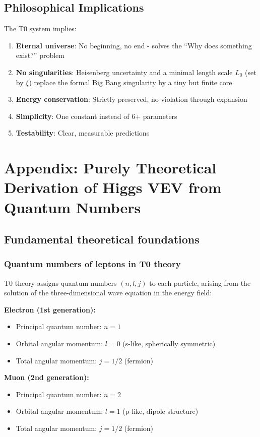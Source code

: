 \subsection{Philosophical Implications}
\label{subsec:philosophical_implications}

The T0 system implies:
\begin{enumerate}
	\item \textbf{Eternal universe}: No beginning, no end - solves the ``Why does something exist?'' problem
	\item \textbf{No singularities}: Heisenberg uncertainty and a minimal length scale $L_0$ (set by $\xi$) replace the formal Big Bang singularity by a tiny but finite core
	\item \textbf{Energy conservation}: Strictly preserved, no violation through expansion
	\item \textbf{Simplicity}: One constant instead of 6+ parameters
	\item \textbf{Testability}: Clear, measurable predictions
\end{enumerate}
\section{Appendix: Purely Theoretical Derivation of Higgs VEV from Quantum Numbers}

\subsection{Fundamental theoretical foundations}

\subsubsection{Quantum numbers of leptons in T0 theory}

T0 theory assigns quantum numbers $(n, l, j)$ to each particle, arising from the solution of the three-dimensional wave equation in the energy field:

\textbf{Electron (1st generation):}
\begin{itemize}
	\item Principal quantum number: $n = 1$
	\item Orbital angular momentum: $l = 0$ (s-like, spherically symmetric)
	\item Total angular momentum: $j = 1/2$ (fermion)
\end{itemize}

\textbf{Muon (2nd generation):}
\begin{itemize}
	\item Principal quantum number: $n = 2$
	\item Orbital angular momentum: $l = 1$ (p-like, dipole structure)
	\item Total angular momentum: $j = 1/2$ (fermion)
\end{itemize}


